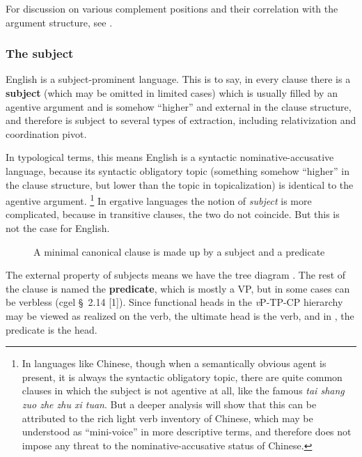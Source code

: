 \documentclass{article}
\newcommand*{\citesec}[1]{\S~{#1}}
\newcommand*{\concept}[1]{\textbf{#1}}
\newcommand*{\term}[1]{\emph{#1}}
\newcommand*{\corpus}[1]{\emph{#1}}
\newcommand*{\vP}{\textit{v}P}
\begin{document}
For discussion on various complement positions and their correlation with the argument structure,
see .

\subsubsection{The subject}\label{sec:subject-predicate}

English is a subject-prominent language.
This is to say, in every clause there is a \concept{subject} 
(which may be omitted in limited cases) %
which is usually filled by an agentive argument
and is somehow ``higher'' and external in the clause structure,
and therefore is subject to several types of extraction, 
including relativization and coordination pivot.

In typological terms, this means English is a syntactic nominative-accusative language,
because its syntactic obligatory topic 
(something somehow ``higher'' in the clause structure,
but lower than the topic in topicalization)
is identical to the agentive argument.%
\footnote{In languages like Chinese, though when a semantically obvious agent is present,
it is always the syntactic obligatory topic, 
there are quite common clauses in which the subject is not agentive at all,
like the famous \corpus{tai shang zuo zhe zhu xi tuan}.
But a deeper analysis will show that this can be attributed to 
the rich light verb inventory of Chinese,
which may be understood as ``mini-voice'' in more descriptive terms,
and therefore does not impose any threat to the nominative-accusative status of Chinese.}
In ergative languages the notion of \term{subject} is more complicated,
because in transitive clauses, the two do not coincide.
But this is not the case for English.

\begin{figure}
    \centering
    
    \caption{A minimal canonical clause is made up by a subject and a predicate}
    \label{fig:subject-predicate}
\end{figure}

The external property of subjects means we have the tree diagram .
The rest of the clause is named the \concept{predicate},
which is mostly a VP, but in some cases can be verbless (\ac{cgel} \citesec{2.14} [1]).
Since functional heads in the \vP-TP-CP hierarchy may be viewed as realized on the verb,
the ultimate head is the verb,
and in , the predicate is the head.
\end{document}

